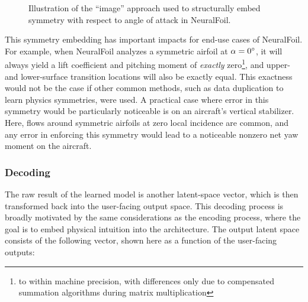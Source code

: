    \begin{figure}[H]
        \centering
        
        \caption{Illustration of the ``image'' approach used to structurally embed symmetry with respect to angle of attack in NeuralFoil.}
        \label{fig:nf-alpha_symmetry}
    \end{figure}

    This symmetry embedding has important impacts for end-use cases of NeuralFoil. For example, when NeuralFoil analyzes a symmetric airfoil at $\alpha=0\degree$, it will always yield a lift coefficient and pitching moment of \textit{exactly} zero\footnote{to within machine precision, with differences only due to compensated summation algorithms during matrix multiplication}, and upper- and lower-surface transition locations will also be exactly equal. This exactness would not be the case if other common methods, such as data duplication to learn physics symmetries, were used. A practical case where error in this symmetry would be particularly noticeable is on an aircraft's vertical stabilizer. Here, flows around symmetric airfoils at zero local incidence are common, and any error in enforcing this symmetry would lead to a noticeable nonzero net yaw moment on the aircraft.

    \subsubsection{Decoding}

    The raw result of the learned model is another latent-space vector, which is then transformed back into the user-facing output space. This decoding process is broadly motivated by the same considerations as the encoding process, where the goal is to embed physical intuition into the architecture. The output latent space consists of the following vector, shown here as a function of the user-facing outputs:

